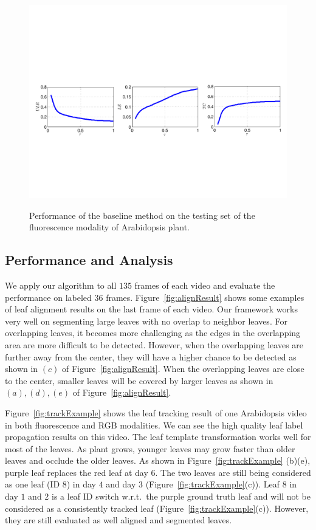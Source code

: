 \begin{figure}
\centering
\includegraphics[width=.81\textwidth]{Figures/performance.pdf}\\
\caption{Performance of the baseline method on the testing set of the fluorescence modality of Arabidopsis plant.}
\label{fig:performance}
\end{figure}


\subsection{Performance and Analysis}
We apply our algorithm to all $135$ frames of each video and evaluate the performance on labeled $36$ frames.
Figure~\ref{fig:alignResult} shows some examples of leaf alignment results on the last frame of each video. 
Our framework works very well on segmenting large leaves with no overlap to neighbor leaves.
For overlapping leaves, it becomes more challenging as the edges in the overlapping area are more difficult to be detected.
However, when the overlapping leaves are further away from the center, they will have a higher chance to be detected as shown in $(c)$ of Figure~\ref{fig:alignResult}.
When the overlapping leaves are close to the center, smaller leaves will be covered by larger leaves as shown in $(a), (d), (e)$ of Figure~\ref{fig:alignResult}.


Figure~\ref{fig:trackExample} shows the leaf tracking result of one Arabidopsis video in both fluorescence and RGB modalities. 
We can see the high quality leaf label propagation results on this video. 
The leaf template transformation works well for most of the leaves.
As plant grows, younger leaves may grow faster than older leaves and occlude the older leaves.
As shown in Figure~\ref{fig:trackExample} (b)(e), purple leaf replaces the red leaf at day $6$.
The two leaves are still being considered as one leaf (ID $8$) in day $4$ and day $3$ (Figure~\ref{fig:trackExample}(c)).
Leaf $8$ in day $1$ and $2$ is a leaf ID switch w.r.t.~the purple ground truth leaf and will not be considered as a consistently tracked leaf (Figure~\ref{fig:trackExample}(c)).
However, they are still evaluated as well aligned and segmented leaves.


